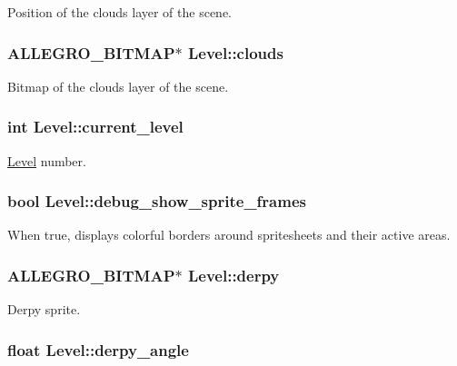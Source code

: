 Position of the clouds layer of the scene. \hypertarget{structLevel_a27d34b57b66d4e7f733cb6a5cc16ff18}{
\subsubsection[{clouds}]{\setlength{\rightskip}{0pt plus 5cm}A\-L\-L\-E\-G\-R\-O\-\_\-\-B\-I\-T\-M\-A\-P$\ast$ Level\-::clouds}}\label{structLevel_a27d34b57b66d4e7f733cb6a5cc16ff18}
Bitmap of the clouds layer of the scene. \hypertarget{structLevel_a1ba3ee0104c912dde5d6e70fee889512}{
\subsubsection[{current\-\_\-level}]{\setlength{\rightskip}{0pt plus 5cm}int Level\-::current\-\_\-level}}\label{structLevel_a1ba3ee0104c912dde5d6e70fee889512}
\hyperlink{structLevel}{Level} number. \hypertarget{structLevel_a1df786b74cff642434ea6587e6141b4d}{
\subsubsection[{debug\-\_\-show\-\_\-sprite\-\_\-frames}]{\setlength{\rightskip}{0pt plus 5cm}bool Level\-::debug\-\_\-show\-\_\-sprite\-\_\-frames}}\label{structLevel_a1df786b74cff642434ea6587e6141b4d}
When true, displays colorful borders around spritesheets and their active areas. \hypertarget{structLevel_ae33832497116b7a0c184959bbde21ee5}{
\subsubsection[{derpy}]{\setlength{\rightskip}{0pt plus 5cm}A\-L\-L\-E\-G\-R\-O\-\_\-\-B\-I\-T\-M\-A\-P$\ast$ Level\-::derpy}}\label{structLevel_ae33832497116b7a0c184959bbde21ee5}
Derpy sprite. \hypertarget{structLevel_a364d35d138549a87532d959288283956}{
\subsubsection[{derpy\-\_\-angle}]{\setlength{\rightskip}{0pt plus 5cm}float Level\-::derpy\-\_\-angle}}\label{structLevel_a364d35d138549a87532d959288283956}
